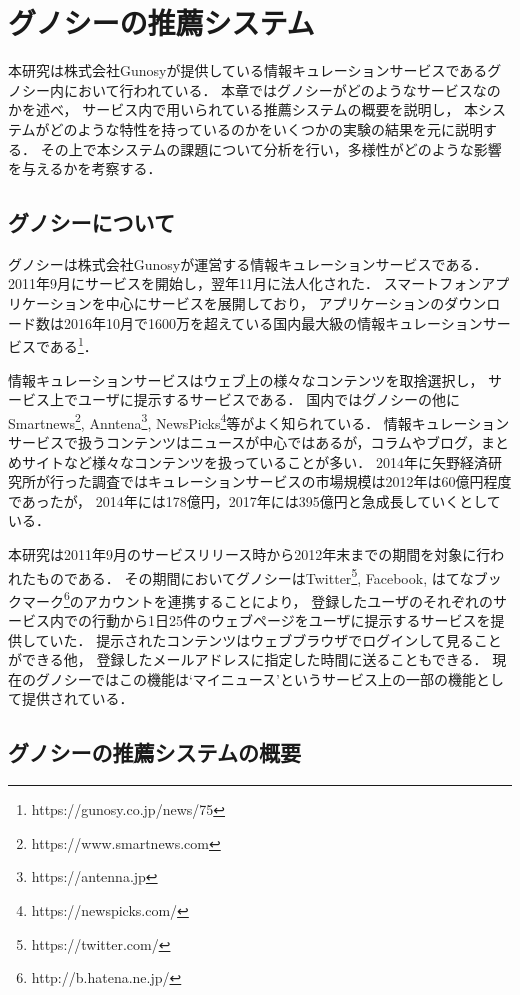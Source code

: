 \documentclass[japanese]{jnlp_1.4}
\begin{document}
\section{グノシーの推薦システム}
\label{sec:gunosy}

本研究は株式会社Gunosyが提供している情報キュレーションサービスであるグノシー内において行われている．
本章ではグノシーがどのようなサービスなのかを述べ，
サービス内で用いられている推薦システムの概要を説明し，
本システムがどのような特性を持っているのかをいくつかの実験の結果を元に説明する．
その上で本システムの課題について分析を行い，多様性がどのような影響を与えるかを考察する．


\subsection{グノシーについて}

グノシーは株式会社Gunosyが運営する情報キュレーションサービスである．
2011年9月にサービスを開始し，翌年11月に法人化された．
スマートフォンアプリケーションを中心にサービスを展開しており，
アプリケーションのダウンロード数は2016年10月で1600万を超えている国内最大級の情報キュレーションサービスである\footnote{https://gunosy.co.jp/news/75}．

情報キュレーションサービスはウェブ上の様々なコンテンツを取捨選択し，
サービス上でユーザに提示するサービスである．
国内ではグノシーの他にSmartnews\footnote{https://www.smartnews.com}, Anntena\footnote{https://antenna.jp}, NewsPicks\footnote{https://newspicks.com/}等がよく知られている．
情報キュレーションサービスで扱うコンテンツはニュースが中心ではあるが，コラムやブログ，まとめサイトなど様々なコンテンツを扱っていることが多い．
2014年に矢野経済研究所が行った調査ではキュレーションサービスの市場規模は2012年は60億円程度であったが，
2014年には178億円，2017年には395億円と急成長していくとしている\cite{yano2014}．

本研究は2011年9月のサービスリリース時から2012年末までの期間を対象に行われたものである．
その期間においてグノシーはTwitter\footnote{https://twitter.com/}, Facebook, はてなブックマーク\footnote{http://b.hatena.ne.jp/}のアカウントを連携することにより，
登録したユーザのそれぞれのサービス内での行動から1日25件のウェブページをユーザに提示するサービスを提供していた．
提示されたコンテンツはウェブブラウザでログインして見ることができる他，
登録したメールアドレスに指定した時間に送ることもできる．
現在のグノシーではこの機能は‘マイニュース’というサービス上の一部の機能として提供されている．


\subsection{グノシーの推薦システムの概要}
\end{document}
